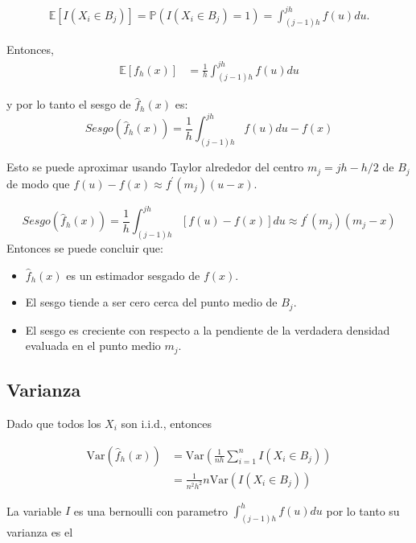 \documentclass[
  12pt,
]{book}
\providecommand{\tightlist}{%
  \setlength{\itemsep}{0pt}\setlength{\parskip}{0pt}}
\theoremstyle{definition}
\theoremstyle{definition}
\theoremstyle{definition}
\theoremstyle{definition}
\theoremstyle{remark}
\begin{document}
\begin{align*}
\mathbb{E}\left[ I(X_i \in B_j)\right] = \mathbb{P}\left(I(X_i \in
B_j)=1\right) = \int_{(j - 1)h}^{jh} f(u)du.
\end{align*}

Entonces,
\begin{align*}
\mathbb{E}\left[{f}_h(x)\right]
& = \frac{1}{h} \int_{(j - 1)h}^{jh} f(u)du
\end{align*}

y por lo tanto el sesgo de \(\hat f_h(x)\) es:
\begin{equation*}
Sesgo(\hat{f}_h(x)) = \frac{1}{h} \int_{(j -
1)h}^{jh} f(u)du - f(x)
\end{equation*}

Esto se puede aproximar usando Taylor alrededor del centro
\(m_j = jh - h/2\) de \(B_j\) de modo que
\(f(u) - f(x) \approx f^{\prime}(m_j)(u - x)\).

\begin{equation*}
Sesgo(\hat{f}_h(x)) =  \frac{1}{h} \int_{(j -
1)h}^{jh} [f(u) - f(x)] du \approx f^\prime(m_j)(m_j - x)
\end{equation*}
Entonces se puede concluir que:

\begin{itemize}
\tightlist
\item
  \(\hat f_h(x)\) es un estimador sesgado de \(f(x)\).
\item
  El sesgo tiende a ser cero cerca del punto medio de \(B_j\).
\item
  El sesgo es creciente con respecto a la pendiente de la verdadera densidad evaluada en el punto medio \(m_j\).
\end{itemize}

\hypertarget{varianza}{%
\subsection{Varianza}\label{varianza}}

Dado que todos los \(X_i\) son i.i.d., entonces

\begin{align*}
\mathrm{Var}\left( \hat{f}_h(x)\right) & =
\mathrm{Var}\left( \frac{1}{nh} \sum_{i = 1}^{n} I(X_i \in B_j)\right)                                  \\
& = \frac{1}{n^2h^2} n\mathrm{Var}\left( I(X_i \in B_j)\right)
\end{align*}

La variable \(I\) es una bernoulli con parametro
\(\int_{(j - 1)h}^{h} f(u)du\) por lo tanto su varianza es el
\end{document}
